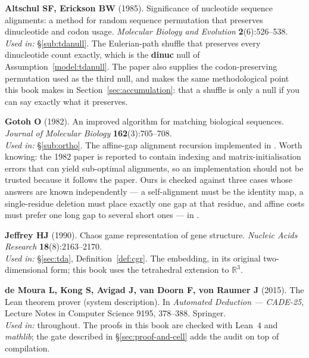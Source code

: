\begin{refs}
\item \textbf{Altschul SF, Erickson BW} (1985). Significance of nucleotide
sequence alignments: a method for random sequence permutation that preserves
dinucleotide and codon usage. \emph{Molecular Biology and Evolution}
\textbf{2}(6):526--538. 
\\[0.15em]
\emph{Used in:} \S\ref{sub:tdanull}. The Eulerian-path shuffle that preserves
every dinucleotide count exactly, which is the \textbf{dinuc} null of
Assumption~\ref{model:tdanull}. The paper also supplies the codon-preserving
permutation used as the third null, and makes the same methodological point this
book makes in Section~\ref{sec:accumulation}: that a shuffle is only a null if
you can say exactly what it preserves.

\item \textbf{Gotoh O} (1982). An improved algorithm for matching biological
sequences. \emph{Journal of Molecular Biology} \textbf{162}(3):705--708.
\\[0.15em]
\emph{Used in:} \S\ref{sub:ortho}. The affine-gap alignment recursion
implemented in
. Worth knowing: the
1982 paper is reported to contain indexing and matrix-initialisation errors that
can yield sub-optimal alignments, so an implementation should not be trusted
because it follows the paper. Ours is checked against three cases whose answers
are known independently --- a self-alignment must be the identity map, a
single-residue deletion must place exactly one gap at that residue, and affine
costs must prefer one long gap to several short ones --- in
.

\item \textbf{Jeffrey HJ} (1990). Chaos game representation of gene structure.
\emph{Nucleic Acids Research} \textbf{18}(8):2163--2170.
\\[0.15em]
\emph{Used in:} §\ref{sec:tda}, Definition~\ref{def:cgr}. The embedding, in its
original two-dimensional form; this book uses the tetrahedral extension to
$\mathbb{R}^3$.

\item \textbf{de Moura L, Kong S, Avigad J, van Doorn F, von Raumer J} (2015).
The Lean theorem prover (system description). In \emph{Automated Deduction ---
CADE-25}, Lecture Notes in Computer Science 9195, 378--388. Springer. \nodoi
\\[0.15em]
\emph{Used in:} throughout. The proofs in this book are checked with Lean~4 and
\emph{mathlib}; the gate described in §\ref{sec:proof-and-cell} adds the
 audit on top of compilation.
\end{refs}

